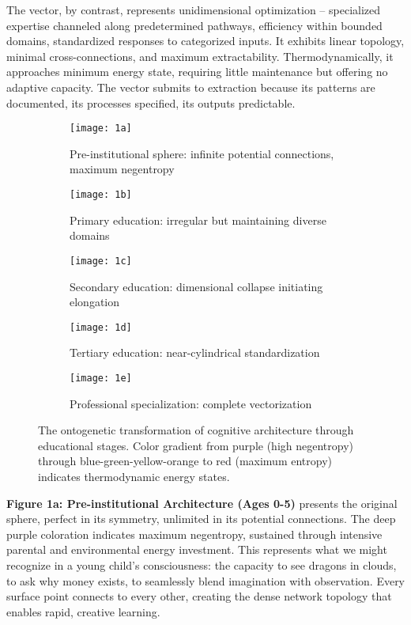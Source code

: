 The vector, by contrast, represents unidimensional optimization – specialized expertise channeled along predetermined pathways, efficiency within bounded domains, standardized responses to categorized inputs. It exhibits linear topology, minimal cross-connections, and maximum extractability. Thermodynamically, it approaches minimum energy state, requiring little maintenance but offering no adaptive capacity. The vector submits to extraction because its patterns are documented, its processes specified, its outputs predictable.

\begin{figure}[htbp]
\centering
\begin{subfigure}[b]{0.18\textwidth}
    \centering
    \texttt{[image: 1a]}
    \caption{\small Pre-institutional sphere: infinite potential connections, maximum negentropy}
\end{subfigure}
\hfill
\begin{subfigure}[b]{0.18\textwidth}
    \centering
    \texttt{[image: 1b]}
    \caption{\small Primary education: irregular but maintaining diverse domains}
\end{subfigure}
\hfill
\begin{subfigure}[b]{0.18\textwidth}
    \centering
    \texttt{[image: 1c]}
    \caption{\small Secondary education: dimensional collapse initiating elongation}
\end{subfigure}
\hfill
\begin{subfigure}[b]{0.18\textwidth}
    \centering
    \texttt{[image: 1d]}
    \caption{\small Tertiary education: near-cylindrical standardization}
\end{subfigure}
\hfill
\begin{subfigure}[b]{0.18\textwidth}
    \centering
    \texttt{[image: 1e]}
    \caption{\small Professional specialization: complete vectorization}
\end{subfigure}
\caption{The ontogenetic transformation of cognitive architecture through educational stages. Color gradient from purple (high negentropy) through blue-green-yellow-orange to red (maximum entropy) indicates thermodynamic energy states.}
\label{fig:from-sphere-to-vector}
\end{figure}

\textbf{Figure 1a: Pre-institutional Architecture (Ages 0-5)} presents the original sphere, perfect in its symmetry, unlimited in its potential connections. The deep purple coloration indicates maximum negentropy, sustained through intensive parental and environmental energy investment. This represents what we might recognize in a young child's consciousness: the capacity to see dragons in clouds, to ask why money exists, to seamlessly blend imagination with observation. Every surface point connects to every other, creating the dense network topology that enables rapid, creative learning.

